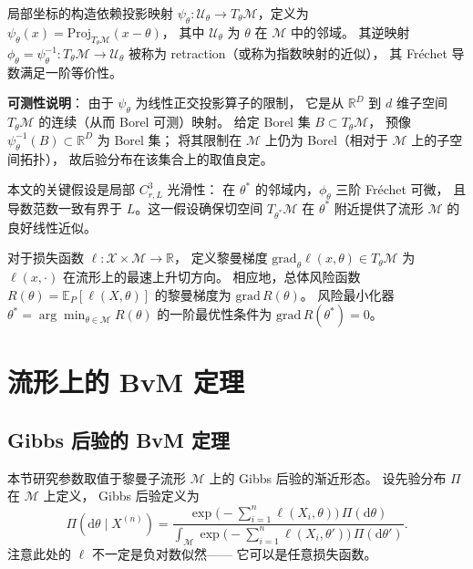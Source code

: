 局部坐标的构造依赖投影映射 $\psi_\theta:\mathcal{U}_\theta\to T_\theta\mathcal{M}$，定义为
$\psi_\theta(x)=\mathrm{Proj}_{T_\theta\mathcal{M}}(x-\theta)$，
其中 $\mathcal{U}_\theta$ 为 $\theta$ 在 $\mathcal{M}$ 中的邻域。
其逆映射 $\phi_\theta=\psi_\theta^{-1}:T_\theta\mathcal{M}\to\mathcal{U}_\theta$
被称为 retraction（或称为指数映射的近似），
其 Fréchet 导数满足一阶等价性。

\textbf{可测性说明}：
由于 $\psi_\theta$ 为线性正交投影算子的限制，
它是从 $\mathbb{R}^D$ 到 $d$ 维子空间 $T_\theta\mathcal{M}$ 的连续（从而 Borel 可测）映射。
给定 Borel 集 $B\subset T_\theta\mathcal{M}$，
预像 $\psi_\theta^{-1}(B)\subset\mathbb{R}^D$ 为 Borel 集；
将其限制在 $\mathcal{M}$ 上仍为 Borel（相对于 $\mathcal{M}$ 上的子空间拓扑），
故后验分布在该集合上的取值良定。

本文的关键假设是局部 $C_{r,L}^3$ 光滑性：
在 $\theta^*$ 的邻域内，$\phi_\theta$ 三阶 Fréchet 可微，
且导数范数一致有界于 $L$。这一假设确保切空间
$T_{\theta^*}\mathcal{M}$ 在 $\theta^*$ 附近提供了流形 $\mathcal{M}$ 的良好线性近似。

对于损失函数 $\ell:\mathcal{X}\times\mathcal{M}\to\mathbb{R}$，
定义黎曼梯度 $\mathrm{grad}_\theta\ell(x,\theta)\in T_\theta\mathcal{M}$
为 $\ell(x,\cdot)$ 在流形上的最速上升切方向。
相应地，总体风险函数 $R(\theta)=\mathbb{E}_P[\ell(X,\theta)]$
的黎曼梯度为 $\mathrm{grad}\,R(\theta)$。
风险最小化器 $\theta^*=\arg\min_{\theta\in\mathcal{M}}R(\theta)$
的一阶最优性条件为 $\mathrm{grad}\,R(\theta^*)=0$。

\section{流形上的 BvM 定理}\label{sec:ch1-bvm}

\subsection{Gibbs 后验的 BvM 定理}\label{sec:ch1-gibbs-bvm}

本节研究参数取值于黎曼子流形 $\mathcal{M}$ 上的 Gibbs 后验的渐近形态。
设先验分布 $\Pi$ 在 $\mathcal{M}$ 上定义，
Gibbs 后验定义为
\begin{equation}\label{eq:ch1-gibbs-posterior}
\Pi(\mathrm{d}\theta\mid X^{(n)})
= \frac{\exp\!\big(-\sum_{i=1}^n\ell(X_i,\theta)\big)\,\Pi(\mathrm{d}\theta)}
      {\int_{\mathcal{M}}\exp\!\big(-\sum_{i=1}^n\ell(X_i,\theta')\big)\,\Pi(\mathrm{d}\theta')}.
\end{equation}
注意此处的 $\ell$ 不一定是负对数似然——
它可以是任意损失函数。

